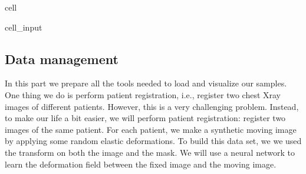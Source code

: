 \documentclass[letterpaper,10pt,english]{jupyterBook}
\begin{document}
\begin{sphinxuseclass}{cell}\begin{sphinxVerbatimInput}

\begin{sphinxuseclass}{cell_input}
\begin{sphinxVerbatim}[commandchars=\\\{\}]
 

  
  \PYG{p}{[}  \PYG{p}{]}
\end{sphinxVerbatim}

\end{sphinxuseclass}\end{sphinxVerbatimInput}

\end{sphinxuseclass}

\subsection{Data management}
\label{\detokenize{notebooks/Tutorial6_Registration/Tutorial6_Registration_student:data-management}}
\sphinxAtStartPar
In this part we prepare all the tools needed to load and visualize our samples. One thing we  do is perform \sphinxhyphen{}patient registration, i.e., register two chest X\sphinxhyphen{}ray images of different patients. However, this is a very challenging problem. Instead, to make our life a bit easier, we will perform \sphinxhyphen{}patient registration: register two images of the same patient. For each patient, we make a synthetic moving image by applying some random elastic deformations. To build this data set, we we used the  transform on both the image and the mask. We will use a neural network to learn the deformation field between the fixed image and the moving image.
\end{document}
